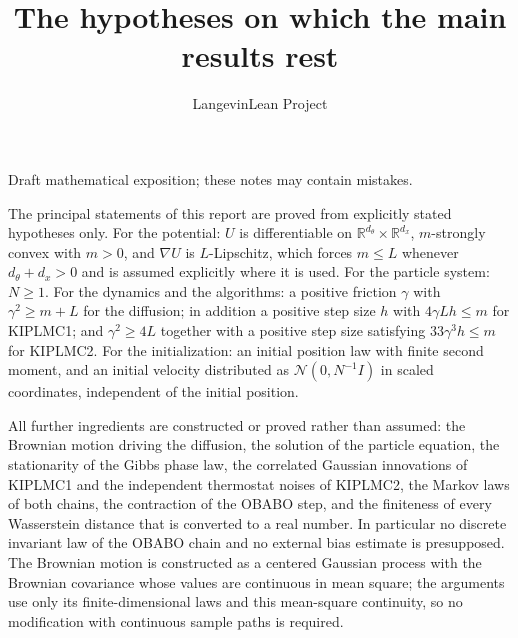 \documentclass[11pt,a4paper]{article}
\title{\texorpdfstring{The hypotheses on which the main results rest}{The hypotheses on which the main results rest}}
\author{LangevinLean Project}
\date{}
\begin{document}
\maketitle
Draft mathematical exposition; these notes may contain mistakes.


The principal statements of this report are proved from explicitly stated hypotheses only. For the potential: \(U\) is differentiable on \(\mathbb R^{d_\theta}\times\mathbb R^{d_x}\), \(m\)-strongly convex with \(m>0\), and \(\nabla U\) is \(L\)-Lipschitz, which forces \(m\le L\) whenever \(d_\theta+d_x>0\) and is assumed explicitly where it is used. For the particle system: \(N\ge1\). For the dynamics and the algorithms: a positive friction \(\gamma\) with \(\gamma^2\ge m+L\) for the diffusion; in addition a positive step size \(h\) with \(4\gamma Lh\le m\) for KIPLMC1; and \(\gamma^2\ge4L\) together with a positive step size satisfying \(33\gamma^3h\le m\) for KIPLMC2. For the initialization: an initial position law with finite second moment, and an initial velocity distributed as \(\mathcal N(0,N^{-1}I)\) in scaled coordinates, independent of the initial position.




All further ingredients are constructed or proved rather than assumed: the Brownian motion driving the diffusion, the solution of the particle equation, the stationarity of the Gibbs phase law, the correlated Gaussian innovations of KIPLMC1 and the independent thermostat noises of KIPLMC2, the Markov laws of both chains, the contraction of the OBABO step, and the finiteness of every Wasserstein distance that is converted to a real number. In particular no discrete invariant law of the OBABO chain and no external bias estimate is presupposed. The Brownian motion is constructed as a centered Gaussian process with the Brownian covariance whose values are continuous in mean square; the arguments use only its finite-dimensional laws and this mean-square continuity, so no modification with continuous sample paths is required.
\end{document}
